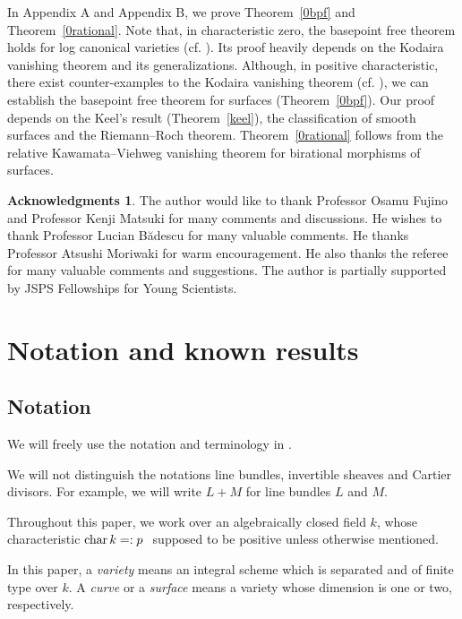 \documentclass[12pt,twoside]{amsart}
\theoremstyle{definition}
\newtheorem*{ack}{Acknowledgments}
\begin{document}
In Appendix A and Appendix B, 
we prove Theorem~\ref{0bpf} and Theorem~\ref{0rational}. 
Note that, in characteristic zero, 
the basepoint free theorem holds for log canonical varieties (cf. \cite[Theorem~13.1]{Fujino1}). 
Its proof heavily depends on the Kodaira vanishing theorem and its generalizations. 
Although, in positive characteristic, there exist counter-examples to the Kodaira vanishing theorem (cf. \cite{Raynaud}), 
we can establish the basepoint free theorem for surfaces (Theorem~\ref{0bpf}). 
Our proof depends on the Keel's result (Theorem~\ref{keel}), the classification of smooth surfaces and 
the Riemann--Roch theorem. 
Theorem~\ref{0rational} follows from the relative Kawamata--Viehweg vanishing theorem 
for birational morphisms of surfaces. 



\begin{ack}
The author would like to 
thank Professor Osamu Fujino and 
Professor Kenji Matsuki for many comments and discussions. 
He wishes to thank Professor Lucian B\u{a}descu 
for many valuable comments. 
He thanks Professor Atsushi Moriwaki 
for warm encouragement. 
He also thanks the referee for many valuable comments and suggestions. 
The author is partially supported by JSPS Fellowships for Young Scientists. 
\end{ack}




\section{Notation and known results}

\subsection{Notation}
We will freely use the notation and terminology in \cite{KM}. 

We will not distinguish the notations line bundles, invertible sheaves and Cartier divisors. 
For example, we will write $L+M$ for line bundles $L$ and $M$. 

Throughout this paper, 
we work over an algebraically closed field $k$, 
whose characteristic ${\rm char}\,k=:p$\,\, 
supposed to be positive 
unless otherwise mentioned.

In this paper, a {\em variety} means 
an integral scheme which is separated and of finite type over $k$. 
A {\em curve} or a {\em surface} means a variety 
whose dimension is one or two, respectively. 
\end{document}
